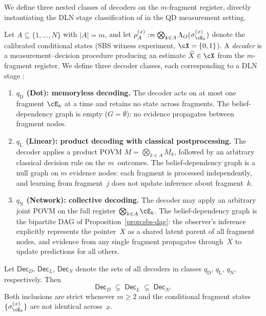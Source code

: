 We define three nested classes of decoders on the $m$-fragment register,
directly instantiating the DLN stage classification of
\citep[Sec.~2.1]{WuDLNCompression2026preprint} in the QD measurement
setting.

\begin{definition}
\label{def:q-states}
Let $A\subseteq\{1,\dots,N\}$ with $|A|=m$, and let
$\rho_A^{(x)} := \bigotimes_{k\in A}\Lambda_O(\sigma^{(x)}_{\cE_k})$
denote the calibrated conditional states (SBS witness experiment,
$\cX=\{0,1\}$).
A \emph{decoder} is a measurement--decision procedure producing an
estimate $\widehat{X}\in\cX$ from the $m$-fragment register.
We define three decoder classes, each corresponding to a DLN stage
\citep[Sec.~2.1]{WuDLNCompression2026preprint}:
%
\begin{enumerate}[leftmargin=2.2em,label=(\roman*)]
\item \textbf{$q_{\mathrm{D}}$ (Dot): memoryless decoding.}
The decoder acts on at most one fragment $\cE_k$ at a time and retains
no state across fragments.
The belief-dependency graph is empty ($G=\emptyset$): no evidence
propagates between fragment nodes.

\item \textbf{$q_{\mathrm{L}}$ (Linear): product decoding with
classical postprocessing.}
The decoder applies a product POVM $M=\bigotimes_{k\in A}M_k$, followed
by an arbitrary classical decision rule on the $m$~outcomes.
The belief-dependency graph is a null graph on $m$ evidence nodes: each
fragment is processed independently, and learning from fragment~$j$ does
not update inference about fragment~$k$.

\item \textbf{$q_{\mathrm{N}}$ (Network): collective decoding.}
The decoder may apply an arbitrary joint POVM on the full register
$\bigotimes_{k\in A}\cE_k$.
The belief-dependency graph is the bipartite DAG of
Proposition~\ref{prop:sbs-dag}: the observer's inference explicitly
represents the pointer~$X$ as a shared latent parent of all fragment
nodes, and evidence from any single fragment propagates through~$X$ to
update predictions for all others.
\end{enumerate}
\end{definition}


\begin{proposition}
\label{prop:nesting}
Let $\mathsf{Dec}_D$, $\mathsf{Dec}_L$, $\mathsf{Dec}_N$ denote the
sets of all decoders in classes $q_{\mathrm{D}}$, $q_{\mathrm{L}}$,
$q_{\mathrm{N}}$, respectively.  Then
\[
  \mathsf{Dec}_D \;\subsetneq\; \mathsf{Dec}_L
                  \;\subsetneq\; \mathsf{Dec}_N.
\]
Both inclusions are strict whenever $m\ge 2$ and the conditional
fragment states $\{\sigma^{(x)}_{\cE_k}\}$ are not identical
across~$x$.
\end{proposition}

